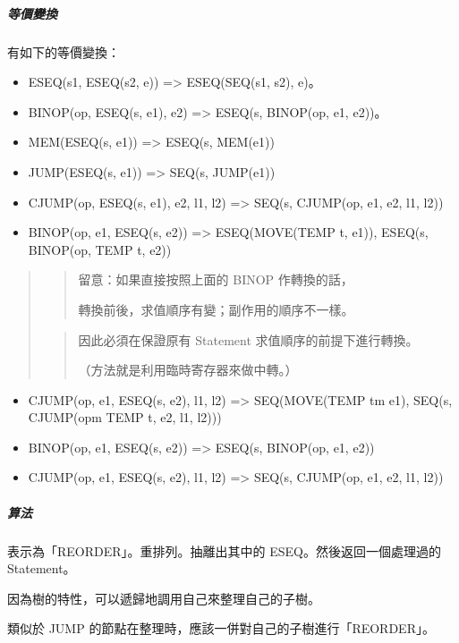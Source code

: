 \documentclass[
]{article}
\begin{document}
\hypertarget{header-n188}{%
\subparagraph{等價變換}\label{header-n188}}

有如下的等價變換：

\begin{itemize}
\item
  ESEQ(s1, ESEQ(s2, e)) =\textgreater{} ESEQ(SEQ(s1, s2), e)。
\item
  BINOP(op, ESEQ(s, e1), e2) =\textgreater{} ESEQ(s, BINOP(op, e1,
  e2))。
\item
  MEM(ESEQ(s, e1)) =\textgreater{} ESEQ(s, MEM(e1))
\item
  JUMP(ESEQ(s, e1)) =\textgreater{} SEQ(s, JUMP(e1))
\item
  CJUMP(op, ESEQ(s, e1), e2, l1, l2) =\textgreater{} SEQ(s, CJUMP(op,
  e1, e2, l1, l2))
\item
  BINOP(op, e1, ESEQ(s, e2)) =\textgreater{} ESEQ(MOVE(TEMP t, e1)),
  ESEQ(s, BINOP(op, TEMP t, e2))
\end{itemize}

\begin{quote}
\begin{quote}
留意：如果直接按照上面的 BINOP 作轉換的話，

轉換前後，求值順序有變；副作用的順序不一樣。
\end{quote}

\begin{quote}
因此必須在保證原有 Statement 求值順序的前提下進行轉換。

（方法就是利用臨時寄存器來做中轉。）
\end{quote}
\end{quote}

\begin{itemize}
\item
  CJUMP(op, e1, ESEQ(s, e2), l1, l2) =\textgreater{} SEQ(MOVE(TEMP tm
  e1), SEQ(s, CJUMP(opm TEMP t, e2, l1, l2)))
\item
  BINOP(op, e1, ESEQ(s, e2)) =\textgreater{} ESEQ(s, BINOP(op, e1, e2))
\item
  CJUMP(op, e1, ESEQ(s, e2), l1, l2) =\textgreater{} SEQ(s, CJUMP(op,
  e1, e2, l1, l2))
\end{itemize}

\hypertarget{header-n217}{%
\subparagraph{算法}\label{header-n217}}

表示為「REORDER」。重排列。抽離出其中的 ESEQ。然後返回一個處理過的
Statement。

因為樹的特性，可以遞歸地調用自己來整理自己的子樹。

類似於 JUMP 的節點在整理時，應該一併對自己的子樹進行「REORDER」。
\end{document}
